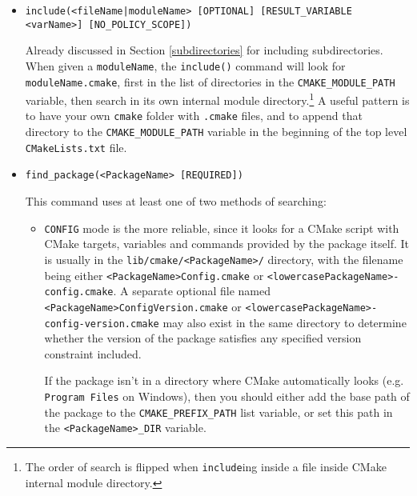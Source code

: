\documentclass[8pt, table, xcdraw]{article}%
\begin{document}
\begin{itemize}
\item
\begin{lstlisting}
include(<fileName|moduleName> [OPTIONAL] [RESULT_VARIABLE <varName>] [NO_POLICY_SCOPE])
\end{lstlisting}
Already discussed in Section \ref{subdirectories} for including subdirectories. When given a \lstinline{moduleName}, the \lstinline{include()} command will look for \lstinline{moduleName.cmake}, first in the list of directories in the \lstinline{CMAKE_MODULE_PATH} variable, then search in its own internal module directory.\footnote{The order of search is flipped when \lstinline{include}ing inside a file inside CMake internal module directory.} A useful pattern is to have your own \lstinline{cmake} folder with \lstinline{.cmake} files, and to append that directory to the \lstinline{CMAKE_MODULE_PATH} variable in the beginning of the top level \lstinline{CMakeLists.txt} file.

\item
\begin{lstlisting}
find_package(<PackageName> [REQUIRED])
\end{lstlisting} 

This command uses at least one of two methods of searching:
\begin{itemize}
    \item \lstinline{CONFIG} mode is the more reliable, since it looks for a CMake script with CMake targets, variables and commands provided by the package itself. It is usually in the \lstinline{lib/cmake/<PackageName>/} directory, with the filename being either \lstinline{<PackageName>Config.cmake} or \lstinline{<lowercasePackageName>-config.cmake}. A separate optional file named \lstinline{<PackageName>ConfigVersion.cmake} or \lstinline{<lowercasePackageName>-config-version.cmake} may also exist in the same directory to determine whether the version of the package satisfies any specified version constraint included.
    
    If the package isn't in a directory where CMake automatically looks (e.g. \lstinline{Program Files} on Windows), then you should either add the base path of the package to the \lstinline{CMAKE_PREFIX_PATH} list variable, or set this path in the \lstinline{<PackageName>_DIR} variable.
    

\end{itemize}
\end{itemize}
\end{document}

